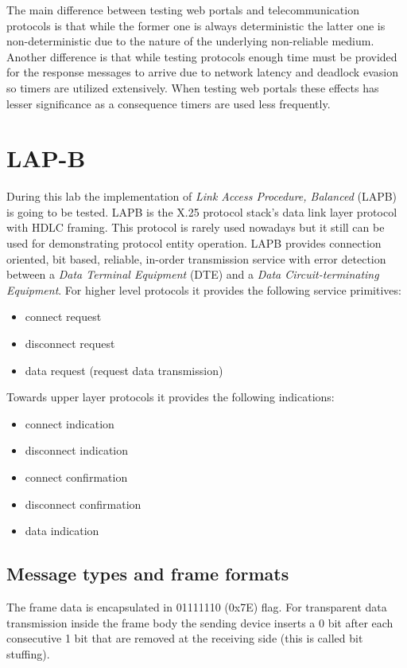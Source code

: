 \documentclass[a4paper]{article}
\begin{document}
The main difference between testing web portals and telecommunication protocols is that while the former one is always deterministic the latter one is non-deterministic due to the nature of the underlying non-reliable medium. Another difference is that while testing protocols enough time must be provided for the response messages to arrive due to network latency and deadlock evasion so timers are utilized extensively. When testing web portals these effects has lesser significance as a consequence timers are used less frequently.


\section{LAP-B}

During this lab the implementation of  \emph{Link Access Procedure, Balanced} (LAPB) is going to be tested. LAPB is the X.25 protocol stack's data link layer protocol with HDLC framing. This protocol is rarely used nowadays but it still can be used for demonstrating protocol entity operation. LAPB provides connection oriented, bit based, reliable, in-order transmission service with error detection between a \emph{Data Terminal Equipment} (DTE) and a \emph{Data Circuit-terminating Equipment}. For higher level protocols it provides the following service primitives:
\begin{itemize}
\item connect request
\item disconnect request
\item data request (request data transmission)
\end{itemize}
Towards upper layer protocols it provides the following indications:
\begin{itemize}
\item connect indication
\item disconnect indication
\item connect confirmation
\item disconnect confirmation
\item data indication
\end{itemize}

\subsection{Message types and frame formats}

The frame data is encapsulated in 01111110 (0x7E) flag. For transparent data transmission inside the frame body the sending device inserts a 0 bit after each consecutive 1 bit that are removed at the receiving side (this is called bit stuffing).
\end{document}
